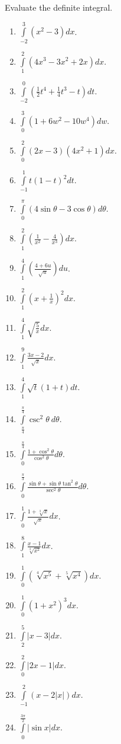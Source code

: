 Evaluate the definite integral.
\begin{multicols}{3}
\begin{enumerate}
\item $\displaystyle \int\limits_{-2}^{3} (x^2-3) dx$.
\item $\displaystyle \int\limits_{1}^{2} (4x^3-3x^2+2x) dx$.
\item $\displaystyle \int\limits_{-2}^{0} \left(\frac{1}{2}t^4+\frac{1}{4}t^3-t \right) dt$.
\item $\displaystyle \int\limits_{0}^{3}(1+6w^2-10w^4) dw$.
\item $\displaystyle \int\limits_{0}^{2}(2x-3)(4x^2+1) dx$.
\item $\displaystyle \int\limits_{-1}^{1} t(1-t)^2 dt$.
\item $\displaystyle \int\limits_{0}^{\pi} (4\sin \theta -3 \cos \theta)d\theta$.
\item $\displaystyle \int\limits_{1}^{2}\left(\frac{1}{x^2}-\frac{4}{x^3}\right) dx$.
\item $\displaystyle \int\limits_{1}^{4}\left(\frac{4+6u}{\sqrt{u}}\right) du$.
\item $\displaystyle \int\limits_{1}^{2}\left(x+\frac{1}{x}\right)^2 dx$.
\item $\displaystyle \int\limits_{1}^{4}\sqrt{\frac{5}{x}} dx$.
\item $\displaystyle \int\limits_{1}^{9}\frac{3x-2}{\sqrt{x}} dx$.
\item $\displaystyle \int\limits_{1}^{4}\sqrt{t}(1+t) dt$.
\item $\displaystyle \int\limits_{\frac{\pi}{4}}^{\frac{\pi}{4}} \csc^2\theta ~d\theta$.
\item $\displaystyle \int\limits_{0}^{\frac{\pi}{4}}\frac{1+\cos^2\theta}{\cos^2\theta} d\theta$.
\item $\displaystyle \int\limits_{0}^{\frac{\pi}{3}} \frac{\sin \theta +\sin \theta \tan^2\theta}{\sec^2\theta}d\theta$.
\item $\displaystyle \int\limits_{0}^1 \frac{1+\sqrt[3]{x}}{\sqrt{x}}dx$.
\item $\displaystyle \int\limits_{1}^{8}\frac{x-1}{\sqrt[3]{x^2}} dx$.
\item $\displaystyle \int\limits_0^{1} (\sqrt[4]{x^5}+\sqrt[5]{x^4})dx $.
\item $\displaystyle \int\limits_{0}^{1}(1+x^2)^3 dx$.
\item $\displaystyle \int\limits_{2}^{5}|x-3| dx$.
\item $\displaystyle \int\limits_{0}^{2} |2x-1| dx$.
\item $\displaystyle \int\limits_{-1}^{2}(x-2|x|) dx$.
\item $\displaystyle \int\limits_{0}^{\frac{3\pi}{2}}|\sin x| dx$.
\end{enumerate}
\end{multicols}
